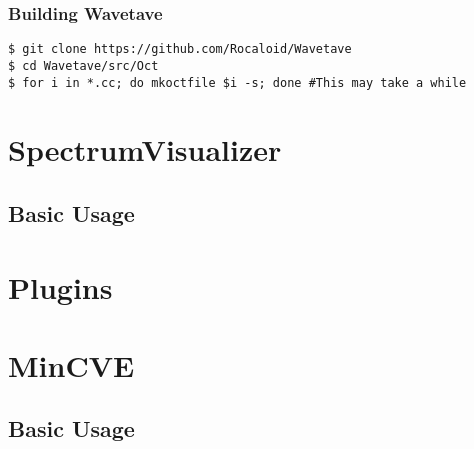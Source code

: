         \subsubsection{Building Wavetave}\indent
        
        \lstset{language = bash, tabsize = 4}
        
        \begin{lstlisting}
$ git clone https://github.com/Rocaloid/Wavetave
$ cd Wavetave/src/Oct
$ for i in *.cc; do mkoctfile $i -s; done #This may take a while
        \end{lstlisting}

\section{SpectrumVisualizer}

\subsection{Basic Usage}

\section{Plugins}

\section{MinCVE}

\subsection{Basic Usage}


